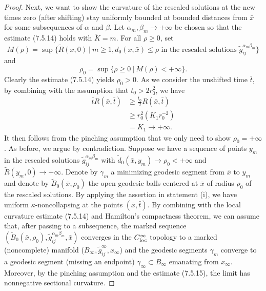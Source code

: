 \begin{proof}
Next, we want to show the curvature of the rescaled solutions at
the new times zero (after shifting) stay uniformly bounded at
bounded distances from $\bar{x}$ for some subsequences of $\alpha$
and $\beta$. Let $\alpha_m,\beta_m\rightarrow+\infty$ be chosen so
that the estimate (7.5.14) holds with $\widetilde{K}=m$. For all
$\rho \geq 0$, set
$$
M(\rho)=\sup\{\widetilde{R}(x,0)\ |\ m \geq 1, d_0(x,\bar{x})\leq
\rho\mbox{ in the rescaled solutions }
\widetilde{g}^{\alpha_m\beta_m}_{ij}\}
$$
and
$$
\rho_0=\sup\{\rho\geq0\ |\ M(\rho)<+\infty\}.
$$
Clearly the estimate (7.5.14) yields $\rho_0>0$. As we consider
the unshifted time $\bar{t}$, by combining with the assumption
that $t_0>2r^2_0$, we have
\begin{align}
\bar{t}R(\bar{x},\bar{t})&  \geq
\frac{t_0}{2}R(\bar{x},\bar{t})\\
&  \geq r^2_0(K_1r^{-2}_0) \nonumber\\
&  = K_1\rightarrow +\infty. \nonumber
\end{align}  %
It then follows from the pinching assumption that we only need to
show $\rho_0=+\infty$. As before, we argue by contradiction.
Suppose we have a sequence of points $y_m$ in the rescaled
solutions $\widetilde{g}^{\alpha_m\beta_m}_{ij}$ with
$\widetilde{d}_0(\bar{x},y_m)\rightarrow \rho_0<+\infty$ and
$\widetilde{R}(y_m,0)\rightarrow+\infty$. Denote by $\gamma_m$ a
minimizing geodesic segment from $\bar{x}$ to $y_m$ and denote by
$\widetilde{B}_0(\bar{x},\rho_0)$ the open geodesic balls centered
at $\bar{x}$ of radius $\rho_0$ of the rescaled solutions. By
applying the assertion in statement (i), we have uniform
$\kappa$-noncollapsing at the points $(\bar{x},\bar{t})$. By
combining with the local curvature estimate (7.5.14) and
Hamilton's compactness theorem, we can assume that, after passing
to a subsequence, the marked sequence
$(\widetilde{B}_0(\bar{x},\rho_0),
\widetilde{g}^{\alpha_m\beta_m}_{ij},\bar{x})$ converges in the
$C^{\infty}_{\rm loc}$ topology to a marked (noncomplete) manifold
($B_{\infty},\widetilde{g}^{\infty}_{ij},x_{\infty}$) and the
geodesic segments $\gamma_m$ converge to a geodesic segment
(missing an endpoint) $\gamma_{\infty}\subset B_{\infty}$
emanating from $x_{\infty}$. Moreover, by the pinching assumption
and the estimate (7.5.15), the limit has nonnegative sectional
curvature.


\end{proof}
